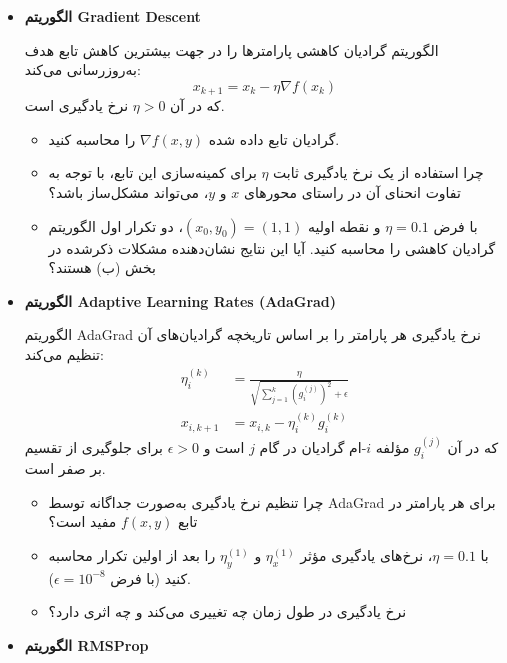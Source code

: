 \begin{itemize}
    \item \textbf{الگوریتم Gradient Descent}
    
    الگوریتم گرادیان کاهشی پارامترها را در جهت بیشترین کاهش تابع هدف به‌روزرسانی می‌کند:
    \begin{equation*}
        x_{k+1} = x_k - \eta \nabla f(x_k)
    \end{equation*}
    که در آن $\eta > 0$ نرخ یادگیری است.
    \begin{itemize}
        \item[(الف)] گرادیان تابع داده شده $\nabla f(x, y)$ را محاسبه کنید.
        \item[(ب)] چرا استفاده از یک نرخ یادگیری ثابت $\eta$ برای کمینه‌سازی این تابع، با توجه به تفاوت انحنای آن در راستای محورهای $x$ و $y$، می‌تواند مشکل‌ساز باشد؟
        \item[(ج)] با فرض $\eta = 0.1$ و نقطه اولیه $(x_0, y_0) = (1, 1)$، دو تکرار اول الگوریتم گرادیان کاهشی را محاسبه کنید. آیا این نتایج نشان‌دهنده مشکلات ذکرشده در بخش (ب) هستند؟
    \end{itemize}

    \item \textbf{الگوریتم Adaptive Learning Rates (AdaGrad)}
    
    الگوریتم AdaGrad نرخ یادگیری هر پارامتر را بر اساس تاریخچه گرادیان‌های آن تنظیم می‌کند:
    \begin{align*}
        \eta_i^{(k)} &= \frac{\eta}{\sqrt{\sum_{j=1}^k (g_i^{(j)})^2} + \epsilon} \\
        x_{i, k+1} &= x_{i, k} - \eta_i^{(k)} g_i^{(k)}
    \end{align*}
    که در آن $g_i^{(j)}$ مؤلفه $i$-ام گرادیان در گام $j$ است و $\epsilon > 0$ برای جلوگیری از تقسیم بر صفر است.
    \begin{itemize}
        \item[(الف)] چرا تنظیم نرخ یادگیری به‌صورت جداگانه توسط AdaGrad برای هر پارامتر در تابع $f(x, y)$ مفید است؟
        \item[(ب)] با $\eta = 0.1$، نرخ‌های یادگیری مؤثر $\eta_x^{(1)}$ و $\eta_y^{(1)}$ را بعد از اولین تکرار محاسبه کنید (با فرض $\epsilon = 10^{-8}$).
        \item[(ج)] نرخ یادگیری در طول زمان چه تغییری می‌کند و چه اثری دارد؟
    \end{itemize}

    \item \textbf{الگوریتم RMSProp}
    

\end{itemize}
